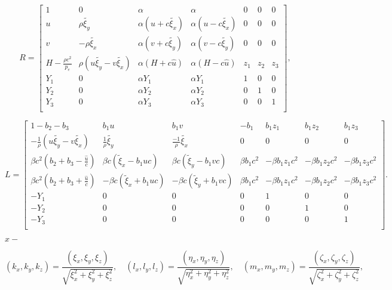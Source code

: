 \documentclass{article}
\begin{document}
\[ \begin{equation*} R= \begin{bmatrix} 1 & 0 & \alpha & \alpha & 0 & 0& 0\\ u & \rho \tilde{\xi_y} & \alpha \left(u+c \tilde{\xi_x}\right) &\alpha \left(u-c \tilde{\xi_x}\right)& 0 & 0& 0 \\ v & -\rho \tilde{\xi_x} & \alpha \left(v+c \tilde{\xi_y}\right) & \alpha \left(v-c \tilde{\xi_y}\right) & 0 & 0& 0 \\ H-\frac{\rho c^2}{p_e} & \rho \left( u \tilde{\xi_y} -v \tilde{\xi_x}\right) & \alpha \left(H+c \hat{u}\right) &\alpha \left(H-c \hat{u}\right) & z_1 & z_2 & z_3\\ Y_1 & 0 & \alpha Y_1 & \alpha Y_1 & 1 & 0 & 0 \\ Y_2 & 0 & \alpha Y_2 & \alpha Y_2 &0 & 1 & 0 \\ Y_3 & 0 & \alpha Y_3 & \alpha Y_3 &0 & 0 & 1 \\ \end{bmatrix}, \end{equation*} \]
\pagebreak

\[ \begin{equation*} L= \begin{bmatrix} 1-b_2-b_3 & b_1 u & b_1 v & -b_1 & b_1z_1 & b_1 z_2 & b_1 z_3\\ -\frac{1}{\rho}(u \tilde{\xi_y}-v\tilde{\xi_x}) & \frac{1}{\rho}\tilde{\xi_y} & \frac{-1}{\rho}\tilde{\xi_x} & 0 & 0 & 0 &0\\ \beta c^2(b_2+b_3-\frac{\hat{u}}{c}) & \beta c (\tilde \xi_x - b_1 u c) & \beta c (\tilde\xi_y -b_1 vc) & \beta b_1 c^2 & -\beta b_1z_1 c^2 & -\beta b_1z_2 c^2 & -\beta b_1 z_3 c^2\\ \beta c^2(b_2+b_3+\frac{\hat{u}}{c}) & -\beta c (\tilde\xi_x + b_1 u c) & -\beta c (\tilde \xi_y +b_1 vc) & \beta b_1 c^2 & -\beta b_1z_1 c^2 & -\beta b_1z_2 c^2 & -\beta b_1 z_3 c^2\\ -Y_1 & 0 & 0 & 0 & 1 & 0 & 0\\ -Y_2 & 0 & 0 & 0 & 0 & 1 & 0\\ -Y_3 & 0 & 0 & 0 & 0 & 0 & 1\\ \end{bmatrix}. \end{equation*} \]
\pagebreak

$x-$
\pagebreak

\[ \begin{equation*} (k_x,k_y,k_z)=\frac{(\xi_x,\xi_y,\xi_z)}{\sqrt{\xi_x^2+\xi_y^2+\xi_z^2}},\quad (l_x,l_y,l_z)=\frac{(\eta_x,\eta_y,\eta_z)}{\sqrt{\eta_x^2+\eta_y^2+\eta_z^2}},\quad (m_x,m_y,m_z)=\frac{(\zeta_x,\zeta_y,\zeta_z)}{\sqrt{\zeta_x^2+\zeta_y^2+\zeta_z^2}}, \end{equation*} \]
\pagebreak
\end{document}
